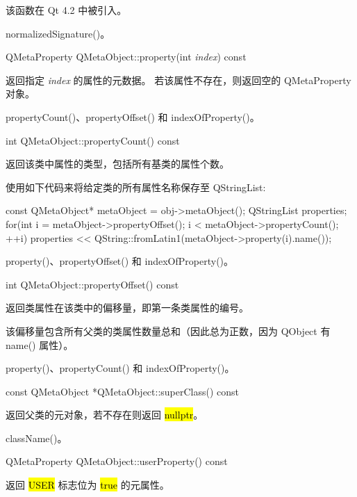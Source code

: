 
该函数在 Qt 4.2 中被引入。

\begin{seeAlso}
normalizedSignature()。
\end{seeAlso}

QMetaProperty QMetaObject::property(int \emph{index}) const

返回指定 \emph{index} 的属性的元数据。
若该属性不存在，则返回空的 QMetaProperty 对象。

\begin{seeAlso}
propertyCount()、propertyOffset() 和 indexOfProperty()。
\end{seeAlso}

int QMetaObject::propertyCount() const

返回该类中属性的类型，包括所有基类的属性个数。

使用如下代码来将给定类的所有属性名称保存至 QStringList: 

\begin{cppcode}
 const QMetaObject* metaObject = obj->metaObject();
 QStringList properties;
 for(int i = metaObject->propertyOffset(); i < metaObject->propertyCount(); ++i)
     properties << QString::fromLatin1(metaObject->property(i).name());
\end{cppcode}

\begin{seeAlso}
property()、propertyOffset() 和 indexOfProperty()。
\end{seeAlso}

int QMetaObject::propertyOffset() const

返回类属性在该类中的偏移量，即第一条类属性的编号。

该偏移量包含所有父类的类属性数量总和（因此总为正数，因为 QObject 有 name() 属性）。

\begin{seeAlso}
property()、propertyCount() 和 indexOfProperty()。
\end{seeAlso}

const QMetaObject *QMetaObject::superClass() const

返回父类的元对象，若不存在则返回 \hl{nullptr}。

\begin{seeAlso}
className()。
\end{seeAlso}

QMetaProperty QMetaObject::userProperty() const

返回 \hl{USER} 标志位为 \hl{true} 的元属性。


